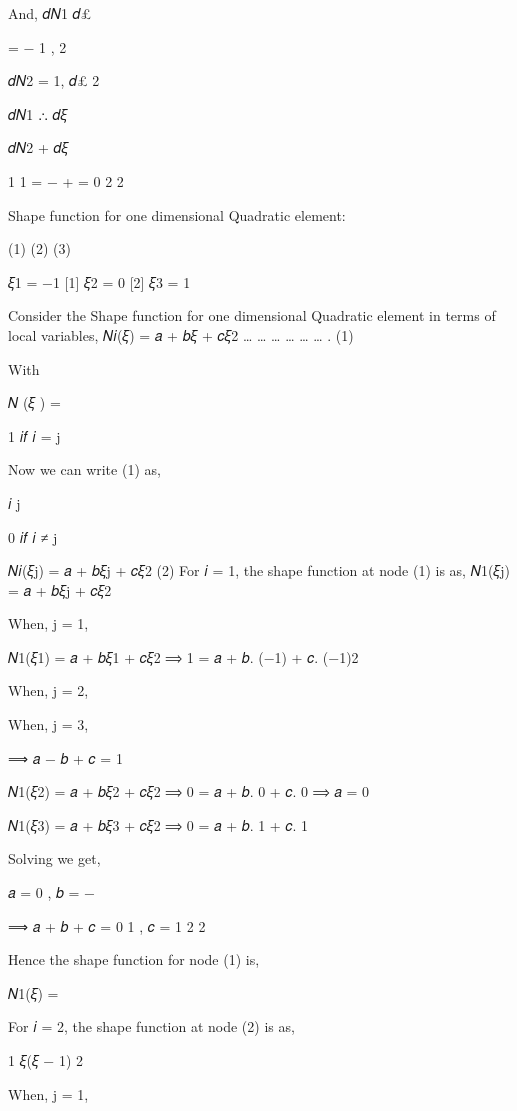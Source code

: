 {{{ 
And,	𝑑𝑁1
𝑑£
 
= − 1 ,
2
 
𝑑𝑁2 = 1,
𝑑£	2
 

 
𝑑𝑁1
∴
𝑑𝜉
 
𝑑𝑁2
+
𝑑𝜉
 
1	1
= −   +   = 0
2	2
 


Shape function for one dimensional Quadratic element:



(1)
	(2)
	(3)

𝜉1 = −1	[1]	𝜉2 = 0	[2]	𝜉3 = 1


Consider the Shape function for one dimensional Quadratic element in terms of local variables,
𝑁𝑖(𝜉) = 𝑎 + 𝑏𝜉 + 𝑐𝜉2	… … … … … … . (1)

 
With
 

𝑁 (𝜉 ) = {1	𝑖𝑓	𝑖 = j
 

Now we can write (1) as,
 
𝑖	j
 
0	𝑖𝑓 𝑖 ≠ j
 
𝑁𝑖(𝜉j) = 𝑎 + 𝑏𝜉j + 𝑐𝜉2	(2)
For 𝑖 = 1, the shape function at node (1) is as,
𝑁1(𝜉j) = 𝑎 + 𝑏𝜉j + 𝑐𝜉2

 
When, j = 1,
 

𝑁1(𝜉1) = 𝑎 + 𝑏𝜉1 + 𝑐𝜉2
⟹ 1 = 𝑎 + 𝑏. (−1) + 𝑐. (−1)2
 

When, j = 2,





When, j = 3,
 
⟹ 𝑎 − 𝑏 + 𝑐 = 1

𝑁1(𝜉2) = 𝑎 + 𝑏𝜉2 + 𝑐𝜉2
⟹ 0 = 𝑎 + 𝑏. 0 + 𝑐. 0
⟹ 𝑎 = 0

𝑁1(𝜉3) = 𝑎 + 𝑏𝜉3 + 𝑐𝜉2
⟹ 0 = 𝑎 + 𝑏. 1 + 𝑐. 1
 

 


Solving we get,
 


𝑎 = 0 , 𝑏 = −
 
⟹ 𝑎 + 𝑏 + 𝑐 = 0
1 ,  𝑐 = 1
2	2
 
Hence the shape function for node (1) is,

 
𝑁1(𝜉) =

For 𝑖 = 2, the shape function at node (2) is as,
 
1
  𝜉(𝜉 − 1)
2
 

 


When, j = 1,



}}}}
